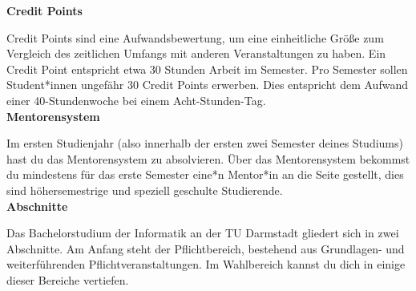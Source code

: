 {    \noindent\textbf{Credit Points}

    Credit Points sind eine Aufwandsbewertung, um eine einheitliche Größe zum Vergleich des zeitlichen Umfangs mit anderen Veranstaltungen zu haben. Ein Credit Point entspricht etwa 30 Stunden Arbeit im Semester. Pro Semester sollen Student*innen ungefähr 30 Credit Points erwerben. Dies entspricht dem Aufwand einer 40-Stundenwoche bei einem Acht-Stunden-Tag.\\

    \noindent\textbf{Mentorensystem}

    Im ersten Studienjahr (also innerhalb der ersten zwei Semester deines Studiums) hast du das Mentorensystem zu absolvieren. Über das Mentorensystem bekommst du mindestens für das erste Semester eine*n Mentor*in an die Seite gestellt, dies sind höhersemestrige und speziell geschulte Studierende.\\

    \noindent\textbf{Abschnitte}


    Das Bachelorstudium der Informatik an der TU Darmstadt gliedert sich in zwei Abschnitte. Am Anfang steht der Pflichtbereich, bestehend aus Grundlagen- und weiterführenden Pflichtveranstaltungen. Im Wahlbereich kannst du dich in einige dieser Bereiche vertiefen.\\

}
